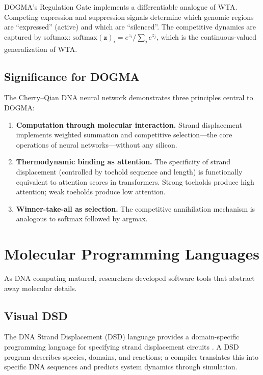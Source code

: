 \begin{implnote}
DOGMA's Regulation Gate implements a differentiable analogue of WTA. Competing expression and suppression signals determine which genomic regions are ``expressed'' (active) and which are ``silenced''. The competitive dynamics are captured by softmax: $\text{softmax}(\mathbf{z})_i = e^{z_i} / \sum_j e^{z_j}$, which is the continuous-valued generalization of WTA.
\end{implnote}

\subsection{Significance for DOGMA}

The Cherry--Qian DNA neural network demonstrates three principles central to DOGMA:

\begin{enumerate}[leftmargin=1.8em]
  \item \textbf{Computation through molecular interaction.} Strand displacement implements weighted summation and competitive selection---the core operations of neural networks---without any silicon.

  \item \textbf{Thermodynamic binding as attention.} The specificity of strand displacement (controlled by toehold sequence and length) is functionally equivalent to attention scores in transformers. Strong toeholds produce high attention; weak toeholds produce low attention.

  \item \textbf{Winner-take-all as selection.} The competitive annihilation mechanism is analogous to softmax followed by argmax.
\end{enumerate}

\section{Molecular Programming Languages}
\label{sec:mol-programming}

As DNA computing matured, researchers developed software tools that abstract away molecular details.

\subsection{Visual DSD}

The DNA Strand Displacement (DSD) language provides a domain-specific programming language for specifying strand displacement circuits \citep{zhang2011}. A DSD program describes species, domains, and reactions; a compiler translates this into specific DNA sequences and predicts system dynamics through simulation.


